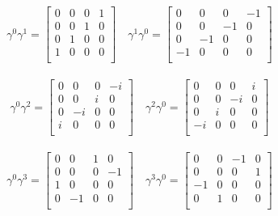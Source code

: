 \documentclass{article}
\begin{document}
\begin{align*}
\gamma^0 \gamma^1 = \begin{bmatrix}
 0  &  0  &  0  &  1  \\
 0  &  0  &  1  &  0  \\
 0  &  1  &  0  &  0  \\
 1  &  0  &  0  &  0  \\
\end{bmatrix} \quad
\gamma^1 \gamma^0 = \begin{bmatrix}
 0  &  0  &  0  &  -1  \\
 0  &  0  &  -1  &  0  \\
 0  &  -1  &  0  &  0  \\
 -1  &  0  &  0  &  0  \\
\end{bmatrix}
\end{align*}

\begin{align*}
\gamma^0 \gamma^2 = \begin{bmatrix}
 0  &  0  &  0  &  -i  \\
 0  &  0  &  i  &  0  \\
 0  &  -i  &  0  &  0  \\
 i  &  0  &  0  &  0  \\
\end{bmatrix} \quad
\gamma^2 \gamma^0 = \begin{bmatrix}
 0  &  0  &  0  &  i  \\
 0  &  0  &  -i  &  0  \\
 0  &  i  &  0  &  0  \\
 -i  &  0  &  0  &  0  \\
\end{bmatrix}
\end{align*}

\begin{align*}
\gamma^0 \gamma^3 = \begin{bmatrix}
 0  &  0  &  1  &  0  \\
 0  &  0  &  0  &  -1  \\
 1  &  0  &  0  &  0  \\
 0  &  -1  &  0  &  0  \\
\end{bmatrix} \quad
\gamma^3 \gamma^0 = \begin{bmatrix}
 0  &  0  &  -1  &  0  \\
 0  &  0  &  0  &  1  \\
 -1  &  0  &  0  &  0  \\
 0  &  1  &  0  &  0  \\
\end{bmatrix}
\end{align*}
\end{document}
